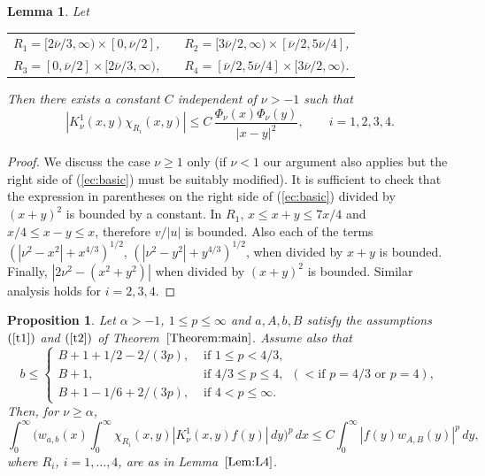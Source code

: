 \documentclass[leqno,a4paper]{amsart}
\newtheorem{Prop}{Proposition}
\newtheorem{Lem}{Lemma}
\newcommand{\overnu}{\overline{\nu}}
\begin{document}
\begin{Lem}
\label{Lem:L4}
Let
\begin{center}
\begin{tabular}{rr}
$R_1=[2\overnu/3,\infty)\times[0,\overnu/2]$, &
$\quad R_2=
[3\overnu/2,\infty)\times[\overnu/2,5\overnu/4]$,\\
$R_3=[0,\overnu/2]\times[2\overnu/3,\infty)$, &
$\quad R_4=
[\overnu/2,5\overnu/4]\times[3\overnu/2,\infty)$.\\
\end{tabular}
\end{center}
Then there exists a constant $C$ independent of $\nu>-1$ such that
\begin{equation*}
|K_\nu^1(x,y)\chi_{R_i}(x,y)|\le C \,\frac{\Phi_\nu(x)\Phi_\nu(y)}{|x-y|^2},
\qquad i=1,2,3,4.
\end{equation*}
\end{Lem}

\begin{proof}
We discuss the case $\nu\ge1$ only (if $\nu<1$ our argument also applies but
the right side of (\ref{ec:basic}) must be suitably modified).
It is sufficient to check that the expression in parentheses on the right side
of (\ref{ec:basic}) divided by $(x+y)^2$ is bounded by a constant.
In $R_1$, $x\le x+y \le 7x/4$ and $x/4\le x-y\le x$, therefore $v/|u|$ is
bounded. Also each of the terms $(|\nu^2-x^2|+x^{4/3})^{1/2}$,
$(|\nu^2-y^2|+y^{4/3})^{1/2}$, when divided by $x+y$ is bounded. Finally,
$|2\nu^2-(x^2+y^2)|$ when divided by $(x+y)^2$ is bounded. Similar analysis
holds for $i=2,3,4$.
\end{proof}

\begin{Prop}
\label{Prop:P4}
Let $\alpha>-1$, $1\le p\le\infty$ and $a,A,b,B$ satisfy the assumptions
$(\ref{t1})$ and $(\ref{t2})$ of Theorem~$\ref{Theorem:main}$. Assume also that
\begin{equation*}
b \le
\begin{cases}
B+1+1/2-2/(3p),& \text{ if } 1\le p<4/3,\\
B+1,& \text{ if } 4/3\le p\le 4,
\,\,\,(< \text{if } p=4/3 \text{ or } p=4),\\
B+1-1/6+2/(3p),& \text{ if } 4<p\le\infty.
\end{cases}
\end{equation*}
Then, for $\nu\ge \alpha$,
\begin{equation}
\label{dod} \int_{0}^{\infty}\bigg(w_{a,b}(x)\int_{0}^{\infty}
\chi_{R_i}(x,y)|K_\nu^{1}(x,y)f(y)|\,dy\bigg)^p\,dx \le
C\int_{0}^{\infty}|f(y)w_{A,B}(y)|^p\,dy,
\end{equation}
where $R_i$, $i=1,\ldots,4$, are as in Lemma~$\ref{Lem:L4}$.
\end{Prop}
\end{document}
